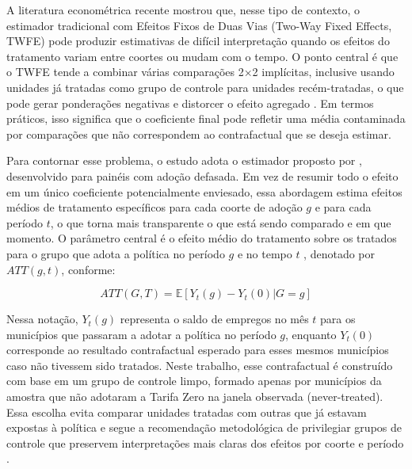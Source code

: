 \documentclass[12pt, a4paper]{article}
\begin{document}
A literatura econométrica recente mostrou que, nesse tipo de contexto, o estimador tradicional com Efeitos Fixos de Duas Vias (Two-Way Fixed Effects, TWFE) pode produzir estimativas de difícil interpretação quando os efeitos do tratamento variam entre coortes ou mudam com o tempo.
O ponto central é que o TWFE tende a combinar várias comparações 2×2 implícitas, inclusive usando unidades já tratadas como grupo de controle para unidades recém-tratadas, o que pode gerar ponderações negativas e distorcer o efeito agregado \citep{DechaisematinDhaultfoeuille2020, goodman2021}.
Em termos práticos, isso significa que o coeficiente final pode refletir uma média contaminada por comparações que não correspondem ao contrafactual que se deseja estimar.

Para contornar esse problema, o estudo adota o estimador proposto por \citet{CallawaySantanna2021}, desenvolvido para painéis com adoção defasada.
Em vez de resumir todo o efeito em um único coeficiente potencialmente enviesado, essa abordagem estima efeitos médios de tratamento específicos para cada coorte de adoção $g$ e para cada período $t$, o que torna mais transparente o que está sendo comparado e em que momento.
O parâmetro central é o efeito médio do tratamento sobre os tratados para o grupo que adota a política no período $g$ e no tempo $t$ , denotado por $ATT\left(g,t\right)$, conforme:

\begin{equation}
ATT(G,T)=\mathbb{E}[Y_t(g)-Y_t(0)|G=g]
\end{equation}

Nessa notação, $Y_t\left(g\right)$ representa o saldo de empregos no mês $t$ para os municípios que passaram a adotar a política no período $g$, enquanto $Y_t(0)$ corresponde ao resultado contrafactual esperado para esses mesmos municípios caso não tivessem sido tratados.
Neste trabalho, esse contrafactual é construído com base em um grupo de controle limpo, formado apenas por municípios da amostra que não adotaram a Tarifa Zero na janela observada (never-treated).
Essa escolha evita comparar unidades tratadas com outras que já estavam expostas à política e segue a recomendação metodológica de privilegiar grupos de controle que preservem interpretações mais claras dos efeitos por coorte e período \citep{CallawaySantanna2021, BakerCallawayCunninghamGoodmanSantanna2025}.
\end{document}
